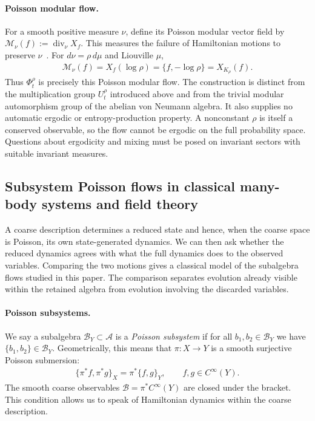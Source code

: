 \documentclass[a4paper,11pt]{article}
\theoremstyle{definition}
\theoremstyle{remark}
\newcommand{\mA}{\mathcal{A}}
\newcommand{\mB}{\mathcal{B}}
\begin{document}
\paragraph{Poisson modular flow.}
For a smooth positive measure $\nu$, define its Poisson modular vector field by
$\mathcal{M}_\nu(f):=\operatorname{div}_\nu X_f$.  This measures the failure of
Hamiltonian motions to preserve $\nu$~\cite{Weinstein1997}.  For $d\nu=\rho\,d\mu$
and Liouville $\mu$,
\begin{align}
    \mathcal{M}_\nu(f)=X_f(\log\rho)=\{f,-\log\rho\}=X_{K_\rho}(f).
\end{align}
Thus $\Phi_t^\rho$ is precisely this Poisson modular flow.  The construction is
distinct from the multiplication group $U_t^\rho$ introduced above and from the trivial
modular automorphism group of the abelian von Neumann algebra.  It also supplies no
automatic ergodic or entropy-production property.  A nonconstant $\rho$ is itself a
conserved observable, so the flow cannot be ergodic on the full probability space.
Questions about ergodicity and mixing must be posed on invariant sectors with suitable
invariant measures.
 
\subsection{Subsystem Poisson flows in classical many-body systems and field theory}%
\label{subsec:classical-subalgebra-Hamiltonian}
 
A coarse description determines a reduced state and hence, when the coarse space is
Poisson, its own state-generated dynamics.  We can then ask whether the reduced
dynamics agrees with what the full dynamics does to the observed variables.  Comparing
the two motions gives a classical model of the subalgebra flows studied in this paper.
The comparison separates evolution already visible within the retained algebra from
evolution involving the discarded variables.
 
\paragraph{Poisson subsystems.}
We say a subalgebra $\mB_Y\subset\mA$ is a \emph{Poisson subsystem} if for all
$b_1,b_2\in\mB_Y$ we have $\{b_1,b_2\}\in\mB_Y$.  Geometrically, this means that
$\pi:X\to Y$ is a smooth surjective Poisson submersion:
\begin{align}\label{eq:classical-Poisson-subsystem}
    \{\pi^*f,\pi^*g\}_X=\pi^*\{f,g\}_Y,\qquad f,g\in C^\infty(Y).
\end{align}
The smooth coarse observables $\mathcal{B}=\pi^*C^\infty(Y)$ are closed under the
bracket.  This condition allows us to speak of Hamiltonian dynamics within the coarse
description.
 
\end{document}
